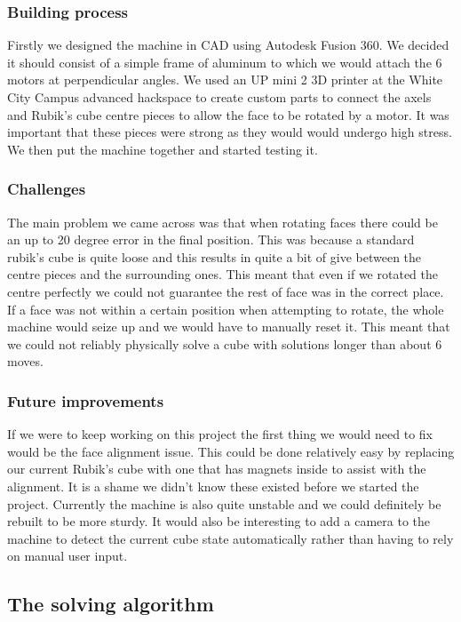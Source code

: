 \documentclass[8pt]{article}
\begin{document}
\subsubsection{Building process}

Firstly we designed the machine in CAD using Autodesk Fusion 360. We decided it should 
consist of a simple frame of aluminum to which we would attach the 6 motors at perpendicular 
angles. We used an UP mini 2 3D printer at the White City Campus advanced hackspace to create 
custom parts to connect the axels and Rubik's cube centre pieces to allow the face to be rotated 
by a motor. It was important that these pieces were strong as they would would undergo 
high stress. We then put the machine together and started testing it.

\subsubsection{Challenges}

The main problem we came across was that when rotating faces there could be an 
up to 20 degree error in the final position. This was because a standard rubik's
 cube is quite loose and this results in quite a bit of give between the centre 
 pieces and the surrounding ones. This meant that even if we rotated the centre 
 perfectly we could not guarantee the rest of face was in the correct place. If 
 a face was not within a certain position when attempting to rotate, the whole 
 machine would seize up and we would have to manually reset it. This meant that
  we could not reliably physically solve a cube with solutions longer than about 6 moves.


\subsubsection{Future improvements}

If we were to keep working on this project the first thing we would need to fix 
would be the face alignment issue. This could be done relatively easy by replacing
our current Rubik's cube with one that has magnets inside to assist with the alignment.
It is a shame we didn't know these existed before we started the project. Currently 
the machine is also quite unstable and we could definitely be rebuilt to be more sturdy. 
It would also be interesting to add a camera to the machine to detect the current cube state
automatically rather than having to rely on manual user input.


\subsection{The solving algorithm}
\end{document}

